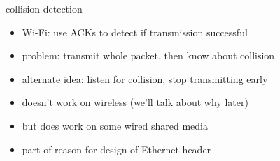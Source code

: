 \begin{frame}{collision detection}
    \begin{itemize}
    \item Wi-Fi: use ACKs to detect if transmission successful
    \item problem: transmit whole packet, then know about collision
    \vspace{.5cm}
    \item alternate idea: listen for collision, stop transmitting early
    \item doesn't work on wireless (we'll talk about why later)
    \item but does work on some wired shared media
    \item part of reason for design of Ethernet header
    \end{itemize}
\end{frame}

